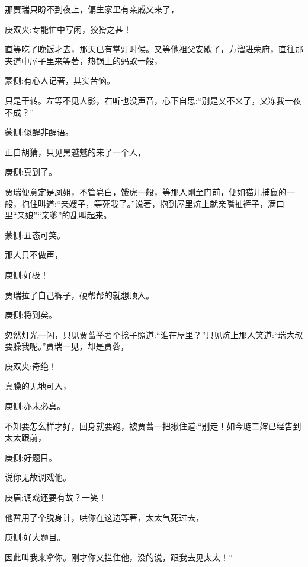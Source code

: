 \begin{parag}
    那贾瑞只盼不到夜上，偏生家里有亲戚又来了，\begin{note}庚双夹:专能忙中写闲，狡猾之甚！\end{note}直等吃了晚饭才去，那天已有掌灯时候。又等他祖父安歇了，方溜进荣府，直往那夹道中屋子里来等著，热锅上的蚂蚁一般，\begin{note}蒙侧:有心人记著，其实苦恼。\end{note}只是干转。左等不见人影，右听也没声音，心下自思:“别是又不来了，又冻我一夜不成？”\begin{note}蒙侧:似醒非醒语。\end{note}正自胡猜，只见黑魆魆的来了一个人，\begin{note}庚侧:真到了。\end{note}贾瑞便意定是凤姐，不管皂白，饿虎一般，等那人刚至门前，便如猫儿捕鼠的一般，抱住叫道:“亲嫂子，等死我了。”说著，抱到屋里炕上就亲嘴扯裤子，满口里“亲娘”“亲爹”的乱叫起来。\begin{note}蒙侧:丑态可笑。\end{note}那人只不做声，\begin{note}庚侧:好极！\end{note}贾瑞拉了自己裤子，硬帮帮的就想顶入。\begin{note}庚侧:将到矣。\end{note}忽然灯光一闪，只见贾蔷举著个捻子照道:“谁在屋里？”只见炕上那人笑道:“瑞大叔要臊我呢。”贾瑞一见，却是贾蓉，\begin{note}庚双夹:奇绝！\end{note}真臊的无地可入，\begin{note}庚侧:亦未必真。\end{note}不知要怎么样才好，回身就要跑，被贾蔷一把揪住道:“别走！如今琏二婶已经告到太太跟前，\begin{note}庚侧:好题目。\end{note}说你无故调戏他。\begin{note}庚眉:调戏还要有故？一笑！\end{note}他暂用了个脱身计，哄你在这边等著，太太气死过去，\begin{note}庚侧:好大题目。\end{note}因此叫我来拿你。刚才你又拦住他，没的说，跟我去见太太！”
\end{parag}


